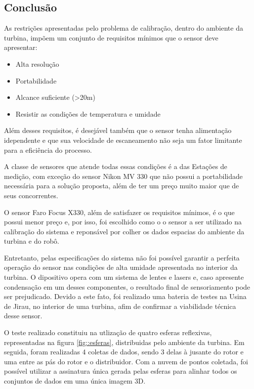 \subsection{Conclusão}

As restrições apresentadas pelo problema de calibração, dentro do ambiente da
turbina, impõem um conjunto de requisitos mínimos que o sensor deve apresentar:

\begin{itemize}
  \item Alta resolução
  \item Portabilidade
  \item Alcance suficiente (>20m)
  \item Resistir as condições de temperatura e umidade 
\end{itemize}

Além desses requisitos, é desejável também que o sensor tenha alimentação
idependente e que sua velocidade de escaneamento não seja um fator limitante
para a eficiência do processo.

A classe de sensores que atende todas essas condições é a das Estações de
medição, com exceção do sensor Nikon MV 330 que não possui a portabilidade
necessária para a solução proposta, além de ter um preço muito maior que de seus
concorrentes.

O sensor Faro Focus X330, além de satisfazer os requisitos mínimos, é o que
possui menor preço e, por isso, foi escolhido como o o sensor a ser utilizado na
calibração do sistema e reponsável por colher os dados espacias do ambiente da
turbina e do robô. 

Entretanto, pelas especificações do sistema não foi possível garantir a perfeita
operação do sensor nas condições de alta umidade apresentada no interior da
turbina. O dipositivo opera com um sistema de lentes e lasers e, caso apresente
condensação em um desses componentes, o resultado final de sensoriamento pode
ser prejudicado. Devido a este fato, foi realizado uma bateria de testes na
Usina de Jirau, no interior de uma turbina, afim de confirmar a viabilidade
técnica desse sensor.

O teste realizado constituiu na utlização de quatro esferas reflexivas,
representadas na figura \ref{fig::esferas}, distribuidas pelo ambiente da
turbina.
Em seguida, foram realizadas 4 coletas de dados, sendo 3 delas à jusante do
rotor e uma entre as pás do rotor e o distribuidor. Com a nuvem de pontos
coletada, foi possível utilizar a assinatura única gerada pelas esferas para
alinhar todos os conjuntos de dados em uma única imagem 3D.

